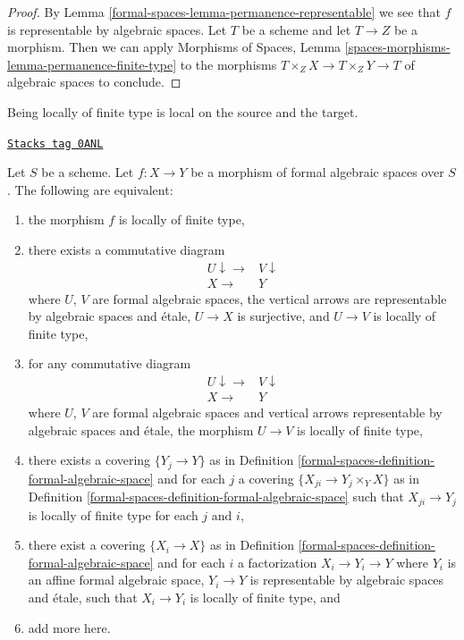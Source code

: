 \begin{proof}
By Lemma \ref{formal-spaces-lemma-permanence-representable} we see that $f$ is
representable by algebraic spaces. Let $T$ be a scheme and let
$T \to Z$ be a morphism. Then we can apply
Morphisms of Spaces, Lemma \ref{spaces-morphisms-lemma-permanence-finite-type}
to the morphisms
$T \times_Z X \to T \times_Z Y \to T$ of algebraic spaces to conclude.
\end{proof}

Being locally of finite type is local on the source and the target.

\begin{lemma}
\label{formal-spaces-lemma-finite-type-local}
\href{https://stacks.math.columbia.edu/tag/0ANL}{\texttt{Stacks tag 0ANL}}

Let $S$ be a scheme. Let $f : X \to Y$ be a morphism of formal algebraic
spaces over $S$. The following are equivalent:
\begin{enumerate}
\item the morphism $f$ is locally of finite type,
\item there exists a commutative diagram
$$
\begin{array}{cc}U \downarrow\longrightarrow & V \downarrow \\ X \longrightarrow & Y\end{array}
$$
where $U$, $V$ are formal algebraic spaces, the vertical arrows are
representable by algebraic spaces and \'etale, $U \to X$
is surjective, and $U \to V$ is locally of finite type,
\item for any commutative diagram
$$
\begin{array}{cc}U \downarrow\longrightarrow & V \downarrow \\ X \longrightarrow & Y\end{array}
$$
where $U$, $V$ are formal algebraic spaces and vertical arrows
representable by algebraic spaces and \'etale, the morphism
$U \to V$ is locally of finite type,
\item there exists a covering $\{Y_j \to Y\}$ as in
Definition \ref{formal-spaces-definition-formal-algebraic-space}
and for each $j$ a covering $\{X_{ji} \to Y_j \times_Y X\}$ as in
Definition \ref{formal-spaces-definition-formal-algebraic-space} such that
$X_{ji} \to Y_j$ is locally of finite type for each $j$ and $i$,
\item there exist a covering $\{X_i \to X\}$ as in
Definition \ref{formal-spaces-definition-formal-algebraic-space}
and for each $i$ a factorization $X_i \to Y_i \to Y$ where $Y_i$
is an affine formal algebraic space, $Y_i \to Y$ is representable
by algebraic spaces and \'etale, such that $X_i \to Y_i$ is
locally of finite type, and
\item add more here.
\end{enumerate}
\end{lemma}


